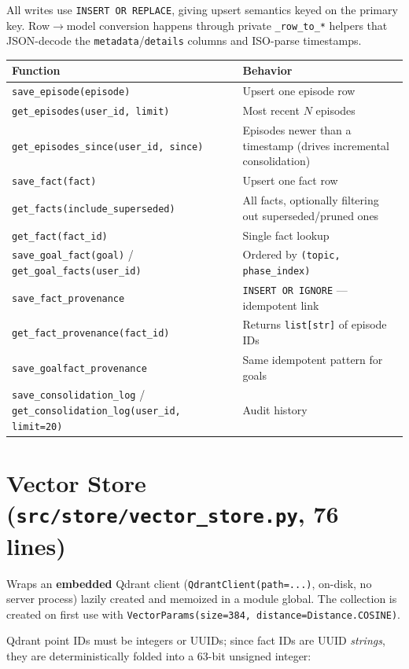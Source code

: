 \documentclass[11pt,a4paper]{report}
\newcommand{\code}[1]{\texttt{\small #1}}
\newcommand{\file}[1]{\texttt{\small\color{accent!70!black}#1}}
\begin{document}
All writes use \code{INSERT OR REPLACE}, giving upsert semantics keyed on the primary key. Row$\to$model conversion happens through private \code{\_row\_to\_*} helpers that JSON-decode the \code{metadata}/\code{details} columns and ISO-parse timestamps.

\begin{longtable}{L{5.5cm}L{8cm}}
\toprule
\textbf{Function} & \textbf{Behavior} \\
\midrule
\endhead
\code{save\_episode(episode)} & Upsert one episode row \\
\code{get\_episodes(user\_id, limit)} & Most recent $N$ episodes \\
\code{get\_episodes\_since(user\_id, since)} & Episodes newer than a timestamp (drives incremental consolidation) \\
\code{save\_fact(fact)} & Upsert one fact row \\
\code{get\_facts(include\_superseded)} & All facts, optionally filtering out superseded/pruned ones \\
\code{get\_fact(fact\_id)} & Single fact lookup \\
\code{save\_goal\_fact(goal)} / \code{get\_goal\_facts(user\_id)} & Ordered by \code{(topic, phase\_index)} \\
\code{save\_fact\_provenance} & \code{INSERT OR IGNORE} — idempotent link \\
\code{get\_fact\_provenance(fact\_id)} & Returns \code{list[str]} of episode IDs \\
\code{save\_goalfact\_provenance} & Same idempotent pattern for goals \\
\code{save\_consolidation\_log} / \code{get\_consolidation\_log(user\_id, limit=20)} & Audit history \\
\bottomrule
\end{longtable}

\section{Vector Store (\file{src/store/vector\_store.py}, 76 lines)}

Wraps an \textbf{embedded} Qdrant client (\code{QdrantClient(path=...)}, on-disk, no server process) lazily created and memoized in a module global. The collection is created on first use with \code{VectorParams(size=384, distance=Distance.COSINE)}.

Qdrant point IDs must be integers or UUIDs; since fact IDs are UUID \emph{strings}, they are deterministically folded into a 63-bit unsigned integer:
\end{document}
